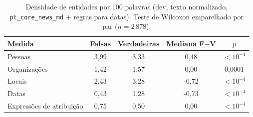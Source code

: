 \begin{table}[t]\centering\small
\caption{Densidade de entidades por 100 palavras (dev, texto normalizado, \texttt{pt\_core\_news\_md} + regras para datas). Teste de Wilcoxon emparelhado por par ($n=2\,878$).}\label{tab:iedens}
\begin{tabular}{lcccc}
\toprule
Medida & Falsas & Verdadeiras & Mediana F$-$V & $p$ \\
\midrule
Pessoas & 3,99 & 3,33 & 0,48 & $<10^{-4}$ \\
Organizações & 1,42 & 1,57 & 0,00 & 0,0001 \\
Locais & 2,43 & 3,28 & -0,72 & $<10^{-4}$ \\
Datas & 0,43 & 1,28 & -0,73 & $<10^{-4}$ \\
Expressões de atribuição & 0,75 & 0,50 & 0,00 & $<10^{-4}$ \\
\bottomrule
\end{tabular}
\end{table}
